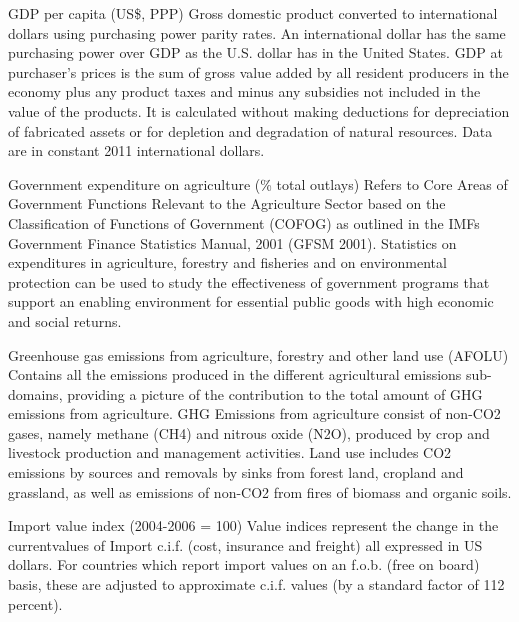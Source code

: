 \begin{MetadataCollection} {}
\begin{metadata}{GDP per capita (US\$, PPP)} {}
Gross domestic product converted to international dollars using purchasing power parity rates. An international dollar has the same purchasing power over GDP as the U.S. dollar has in the United States. GDP at purchaser's prices is the sum of gross value added by all resident producers in the economy plus any product taxes and minus any subsidies not included in the value of the products. It is calculated without making deductions for depreciation of fabricated assets or for depletion and degradation of natural resources. Data are in constant 2011 international dollars.
\end{metadata}

\begin{metadata}{Government expenditure on agriculture (\% total outlays)} {}
Refers to Core Areas of Government Functions Relevant to the Agriculture Sector based on the Classification of Functions of Government (COFOG) as outlined in the IMFs Government Finance Statistics Manual, 2001 (GFSM 2001). Statistics on expenditures in agriculture, forestry and fisheries and on environmental protection can be used to study the effectiveness of government programs that support an enabling environment for essential public goods with high economic and social returns. 
\end{metadata}

\begin{metadata}{Greenhouse gas emissions from agriculture, forestry and other land use (AFOLU)} {}
Contains all the emissions produced in the different agricultural emissions sub-domains, providing a picture of the contribution to the total amount of GHG emissions from agriculture.  GHG Emissions from agriculture consist of non-CO2 gases, namely methane (CH4) and nitrous oxide (N2O), produced by crop and livestock production and management activities. Land use includes CO2 emissions by sources and removals by sinks from forest land, cropland and grassland, as well as emissions of non-CO2 from fires of biomass and organic soils. 
\end{metadata}

\begin{metadata}{Import value index (2004-2006 = 100)} {}
Value indices represent the change in the currentvalues of Import c.i.f. (cost, insurance and freight) all expressed in US dollars. For countries which report import values on an f.o.b. (free on board) basis, these are adjusted to approximate c.i.f. values (by a standard factor of 112 percent).
\end{metadata}


\end{MetadataCollection}
